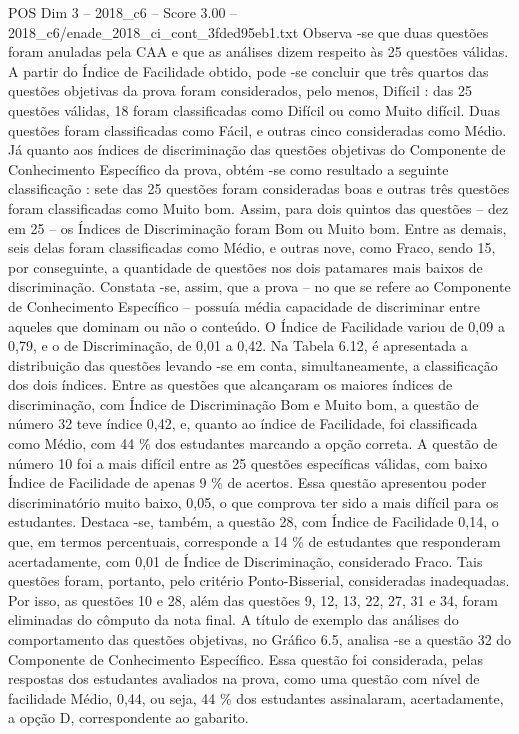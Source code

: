 \begin{textsample}{POS Dim 3 – 2018\_c6 – Score 3.00 – 2018\_c6/enade\_2018\_ci\_cont\_3fded95eb1.txt}
Observa -se que duas questões foram anuladas pela CAA e que as análises dizem respeito às 25 questões válidas.
A partir do Índice de Facilidade obtido, pode -se concluir que três quartos das questões objetivas da prova foram considerados, pelo menos, Difícil : das 25 questões válidas, 18 foram classificadas como Difícil ou como Muito difícil.
Duas questões foram classificadas como Fácil, e outras cinco consideradas como Médio.
Já quanto aos índices de discriminação das questões objetivas do Componente de Conhecimento Específico da prova, obtém -se como resultado a seguinte classificação : sete das 25 questões foram consideradas boas e outras três questões foram classificadas como Muito bom.
Assim, para dois quintos das questões – dez em 25 – os Índices de Discriminação foram Bom ou Muito bom.
Entre as demais, seis delas foram classificadas como Médio, e outras nove, como Fraco, sendo 15, por conseguinte, a quantidade de questões nos dois patamares mais baixos de discriminação.
Constata -se, assim, que a prova – no que se refere ao Componente de Conhecimento Específico – possuía média capacidade de discriminar entre aqueles que dominam ou não o conteúdo.
O Índice de Facilidade variou de 0,09 a 0,79, e o de Discriminação, de 0,01 a 0,42.
Na Tabela 6.12, é apresentada a distribuição das questões levando -se em conta, simultaneamente, a classificação dos dois índices.
Entre as questões que alcançaram os maiores índices de discriminação, com Índice de Discriminação Bom e Muito bom, a questão de número 32 teve índice 0,42, e, quanto ao índice de Facilidade, foi classificada como Médio, com 44 \% dos estudantes marcando a opção correta.
A questão de número 10 foi a mais difícil entre as 25 questões específicas válidas, com baixo Índice de Facilidade de apenas 9 \% de acertos.
Essa questão apresentou poder discriminatório muito baixo, 0,05, o que comprova ter sido a mais difícil para os estudantes.
Destaca -se, também, a questão 28, com Índice de Facilidade 0,14, o que, em termos percentuais, corresponde a 14 \% de estudantes que responderam acertadamente, com 0,01 de Índice de Discriminação, considerado Fraco.
Tais questões foram, portanto, pelo critério Ponto-Bisserial, consideradas inadequadas.
Por isso, as questões 10 e 28, além das questões 9, 12, 13, 22, 27, 31 e 34, foram eliminadas do cômputo da nota final.
A título de exemplo das análises do comportamento das questões objetivas, no Gráfico 6.5, analisa -se a questão 32 do Componente de Conhecimento Específico.
Essa questão foi considerada, pelas respostas dos estudantes avaliados na prova, como uma questão com nível de facilidade Médio, 0,44, ou seja, 44 \% dos estudantes assinalaram, acertadamente, a opção D, correspondente ao gabarito.

\end{textsample}
